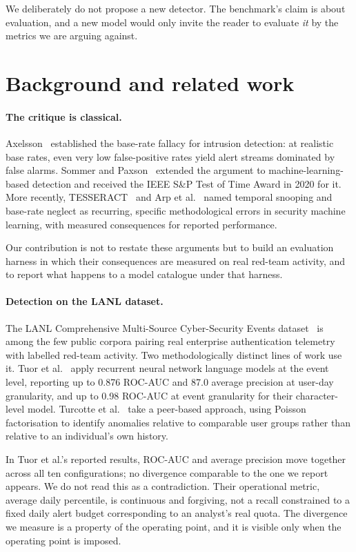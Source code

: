 \documentclass[11pt,a4paper]{article}
\begin{document}
We deliberately do not propose a new detector. The benchmark's claim is about
evaluation, and a new model would only invite the reader to evaluate \emph{it} by
the metrics we are arguing against.

\section{Background and related work}

\paragraph{The critique is classical.}
Axelsson~\cite{axelsson2000} established the base-rate fallacy for intrusion
detection: at realistic base rates, even very low false-positive rates yield
alert streams dominated by false alarms. Sommer and Paxson~\cite{sommer2010}
extended the argument to machine-learning-based detection and received the IEEE
S\&P Test of Time Award in 2020 for it. More recently, TESSERACT~\cite{tesseract}
and Arp et al.~\cite{arp2022} named temporal snooping and base-rate neglect as
recurring, specific methodological errors in security machine learning, with
measured consequences for reported performance.

Our contribution is not to restate these arguments but to build an evaluation
harness in which their consequences are measured on real red-team activity, and
to report what happens to a model catalogue under that harness.

\paragraph{Detection on the LANL dataset.}
The LANL Comprehensive Multi-Source Cyber-Security Events
dataset~\cite{kent2015} is among the few public corpora pairing real enterprise
authentication telemetry with labelled red-team activity. Two methodologically
distinct lines of work use it. Tuor et al.~\cite{tuor2018} apply recurrent
neural network language models at the event level, reporting up to 0.876 ROC-AUC
and 87.0 average precision at user-day granularity, and up to 0.98 ROC-AUC at
event granularity for their character-level model. Turcotte et
al.~\cite{turcotte2016} take a peer-based approach, using Poisson factorisation
to identify anomalies relative to comparable user groups rather than relative to
an individual's own history.

In Tuor et al.'s reported results, ROC-AUC and average precision move together
across all ten configurations; no divergence comparable to the one we report
appears. We do not read this as a contradiction. Their operational metric,
average daily percentile, is continuous and forgiving, not a recall
constrained to a fixed daily alert budget corresponding to an analyst's real
quota. The divergence we measure is a property of the operating point, and it is
visible only when the operating point is imposed.
\end{document}
